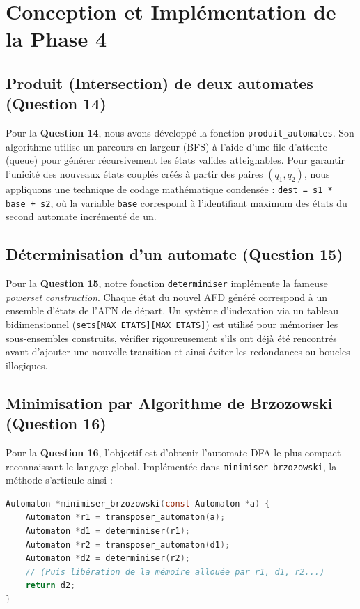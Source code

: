 \documentclass[12pt,a4paper]{article}
\begin{document}
\section{Conception et Implémentation de la Phase 4}

\subsection{Produit (Intersection) de deux automates (Question 14)}
Pour la \textbf{Question 14}, nous avons développé la fonction \texttt{produit\_automates}. Son algorithme utilise un parcours en largeur (BFS) à l'aide d'une file d'attente (queue) pour générer récursivement les états valides atteignables. Pour garantir l'unicité des nouveaux états couplés créés à partir des paires $(q_1, q_2)$, nous appliquons une technique de codage mathématique condensée : \texttt{dest = s1 * base + s2}, où la variable \texttt{base} correspond à l'identifiant maximum des états du second automate incrémenté de un.

\subsection{Déterminisation d'un automate (Question 15)}
Pour la \textbf{Question 15}, notre fonction \texttt{determiniser} implémente la fameuse \textit{powerset construction}. Chaque état du nouvel AFD généré correspond à un ensemble d'états de l'AFN de départ.
Un système d'indexation via un tableau bidimensionnel (\texttt{sets[MAX\_ETATS][MAX\_ETATS]}) est utilisé pour mémoriser les sous-ensembles construits, vérifier rigoureusement s'ils ont déjà été rencontrés avant d'ajouter une nouvelle transition et ainsi éviter les redondances ou boucles illogiques.

\subsection{Minimisation par Algorithme de Brzozowski (Question 16)}
Pour la \textbf{Question 16}, l'objectif est d'obtenir l'automate DFA le plus compact reconnaissant le langage global. Implémentée dans \texttt{minimiser\_brzozowski}, la méthode s'articule ainsi :

\begin{lstlisting}[language=C, caption=Principe interne de l'algorithme de Brzozowski (operations.c)]
Automaton *minimiser_brzozowski(const Automaton *a) {
    Automaton *r1 = transposer_automaton(a);
    Automaton *d1 = determiniser(r1);
    Automaton *r2 = transposer_automaton(d1);
    Automaton *d2 = determiniser(r2);
    // (Puis libération de la mémoire allouée par r1, d1, r2...)
    return d2;
}
\end{lstlisting}
\end{document}
